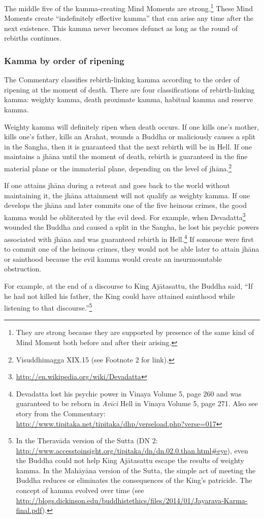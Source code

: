 The middle five of the kamma-creating Mind Moments are strong.\footnote{They are strong because they are supported by presence of the same kind of Mind Moment both before and after their arising.} These Mind Moments create “indefinitely effective kamma” that can arise any time after the next existence. This kamma never becomes defunct as long as the round of rebirths continues.

\subsubsection*{Kamma by order of ripening}

The Commentary classifies rebirth-linking kamma according to the order of ripening at the moment of death. There are four classifications of rebirth-linking kamma: weighty kamma, death proximate kamma, habitual kamma and reserve kamma.

Weighty kamma will definitely ripen when death occurs. If one kills one’s mother, kills one’s father, kills an Arahat, wounds a Buddha or maliciously causes a split in the Sangha, then it is guaranteed that the next rebirth will be in Hell. If one maintains a jhāna until the moment of death, rebirth is guaranteed in the fine material plane or the immaterial plane, depending on the level of jhāna.\footnote{Visuddhimagga XIX.15 (see Footnote 2 for link).} 

If one attains jhāna during a retreat and goes back to the world without maintaining it, the jhāna attainment will not qualify as weighty kamma. If one develops the jhāna and later commits one of the five heinous crimes, the good kamma would be obliterated by the evil deed. For example, when Devadatta\footnote{\url{http://en.wikipedia.org/wiki/Devadatta}} wounded the Buddha and caused a split in the Sangha, he lost his psychic powers associated with jhāna and was guaranteed rebirth in Hell.\footnote{Devadatta lost his psychic power in Vinaya Volume 5, page 260 and was guaranteed to be reborn in \textit{Avīci} Hell in Vinaya Volume 5, page 271. Also see story from the Commentary: \url{http://www.tipitaka.net/tipitaka/dhp/verseload.php?verse=017}} If someone were first to commit one of the heinous crimes, they would not be able later to attain jhāna or sainthood because the evil kamma would create an insurmountable obstruction. 

For example, at the end of a discourse to King Ajātasattu, the Buddha said, “If he had not killed his father, the King could have attained sainthood while listening to that discourse.”\footnote{In the Theravāda version of the Sutta (DN 2: \url{http://www.accesstoinsight.org/tipitaka/dn/dn.02.0.than.html\#eye}), even the Buddha could not help King Ajātasattu escape the results of weighty kamma. In the Mahāyāna version of the Sutta, the simple act of meeting the Buddha reduces or eliminates the consequences of the King’s patricide. The concept of kamma evolved over time (see \url{http://blogs.dickinson.edu/buddhistethics/files/2014/01/Jayarava-Karma-final.pdf}).}

